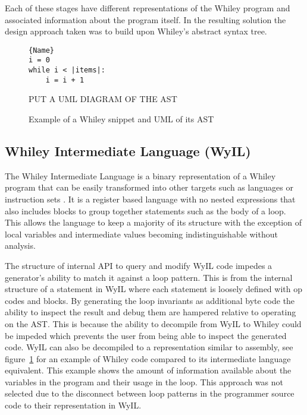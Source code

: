 Each of these stages have different representations of the Whiley program and
associated information about the program itself.
In the resulting solution the design approach taken was to build upon 
Whiley's abstract syntax tree.


\begin{figure}
\noindent\begin{minipage}{.45\textwidth}
\begin{lstlisting}[caption={Whiley Code},frame=tlrb,numbers=none]{Name}
i = 0
while i < |items|:
    i = i + 1
\end{lstlisting}
\end{minipage}\hfill
\begin{minipage}{.45\textwidth}
    PUT A UML DIAGRAM OF THE AST
\end{minipage}
    \label{lst:design-wyil}
    \caption{Example of a Whiley snippet and UML of its AST}
\end{figure}

\subsection{Whiley Intermediate Language (WyIL)}

The Whiley Intermediate Language is a binary representation of a Whiley program
that can be easily transformed into other targets such as languages or
instruction sets \cite{wyil}.
It is a register based language with no nested expressions 
that also includes blocks to group together statements such as the body of a loop.
This allows the language to keep a majority of its structure with the 
exception of local variables and intermediate values becoming indistinguishable 
without analysis.

The structure of internal API to query and modify WyIL code impedes a
generator's ability to match it against a loop pattern.
This is from the internal structure of a statement in WyIL where each
statement is loosely defined with op codes and blocks.
By generating the loop invariants as additional byte code the ability to
inspect the result and debug them are hampered relative to operating on the
AST.  This is because the ability to decompile from WyIL to Whiley could
be impeded which prevents the user from being able to inspect the generated
code. 
WyIL can also be decompiled to a representation similar to assembly, see
figure~\ref{lst:design-wyil} for an example of Whiley code compared to its
intermediate language equivalent.
This example shows the amount of information available about the variables
in the program and their usage in the loop.
This approach was not selected due to the disconnect between loop patterns
in the programmer source code to their representation in WyIL.


